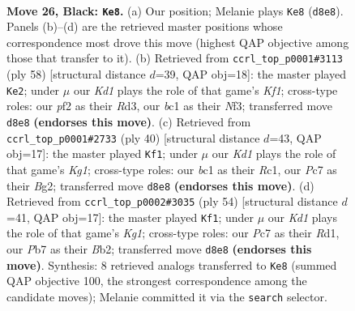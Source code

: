 \documentclass[11pt]{article}
\begin{document}
\clearpage

\begin{figure}[p]\centering
\begin{subfigure}{0.46\textwidth}\centering
\resizebox{\linewidth}{!}{%
\newchessgame
\chessboard[
  setfen={3k4/Nppnpr1p/6p1/p7/7P/2P2P2/P1n1KP2/2B4R b - - 6 26},
  showmover=false,
  pgfstyle=straightmove, color=movearrow, markmove={d8-e8}
]}
\caption{}
\end{subfigure}\hfill
\begin{subfigure}{0.46\textwidth}\centering
\resizebox{\linewidth}{!}{%
\newchessgame
\chessboard[
  setfen={1r2k3/5ppp/2p1pb2/p1P5/P7/1P1R1N1P/5PP1/5K2 w - - 1 30},
  showmover=false,
  pgfstyle=straightmove, color=movearrow, markmove={f1-e2}
]}
\caption{}
\end{subfigure}
\\[4pt]
\begin{subfigure}{0.46\textwidth}\centering
\resizebox{\linewidth}{!}{%
\newchessgame
\chessboard[
  setfen={5k2/3n1ppp/b3p3/8/2pP4/2N3P1/1r2PPBP/2R3K1 w - - 0 21},
  showmover=false,
  pgfstyle=straightmove, color=movearrow, markmove={g1-f1}
]}
\caption{}
\end{subfigure}\hfill
\begin{subfigure}{0.46\textwidth}\centering
\resizebox{\linewidth}{!}{%
\newchessgame
\chessboard[
  setfen={2r3k1/5p1p/p1P3pb/n3P3/Pp1N4/8/1B3PPP/3R2K1 w - - 3 28},
  showmover=false,
  pgfstyle=straightmove, color=movearrow, markmove={g1-f1}
]}
\caption{}
\end{subfigure}
\caption{\textbf{Move 26, Black: \texttt{Ke8}.} (a) Our position; Melanie plays \texttt{Ke8} (\texttt{d8e8}). Panels (b)--(d) are the retrieved master positions whose correspondence most drove this move (highest QAP objective among those that transfer to it). (b) Retrieved from \texttt{ccrl\_top\_p0001\#3113} (ply 58) [structural distance $d$=39, QAP obj=18]: the master played \texttt{Ke2}; under $\mu$ our \emph{Kd1} plays the role of that game's \emph{Kf1}; cross-type roles: our \emph{p}f2 as their \emph{R}d3, our \emph{b}c1 as their \emph{N}f3; transferred move \texttt{d8e8} \textbf{(endorses this move)}. (c) Retrieved from \texttt{ccrl\_top\_p0001\#2733} (ply 40) [structural distance $d$=43, QAP obj=17]: the master played \texttt{Kf1}; under $\mu$ our \emph{Kd1} plays the role of that game's \emph{Kg1}; cross-type roles: our \emph{b}c1 as their \emph{R}c1, our \emph{P}c7 as their \emph{B}g2; transferred move \texttt{d8e8} \textbf{(endorses this move)}. (d) Retrieved from \texttt{ccrl\_top\_p0002\#3035} (ply 54) [structural distance $d$=41, QAP obj=17]: the master played \texttt{Kf1}; under $\mu$ our \emph{Kd1} plays the role of that game's \emph{Kg1}; cross-type roles: our \emph{P}c7 as their \emph{R}d1, our \emph{P}b7 as their \emph{B}b2; transferred move \texttt{d8e8} \textbf{(endorses this move)}. Synthesis: 8 retrieved analogs transferred to \texttt{Ke8} (summed QAP objective 100, the strongest correspondence among the candidate moves); Melanie committed it via the \texttt{search} selector.}
\label{fig:thought-m51}
\end{figure}
\end{document}
